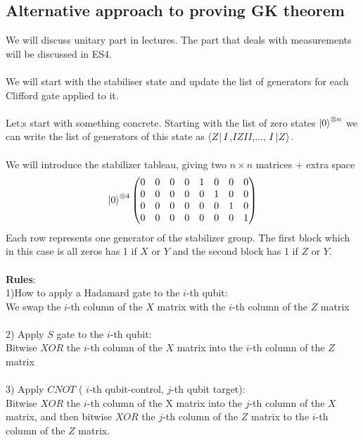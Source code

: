 \documentclass{article}
\begin{document}
\subsection{Alternative approach to proving GK theorem}
We will discuss unitary part in lectures. The part that deals with measurements will be discussed in ES4.\\\\
We will start with the stabiliser state and update the list of generators for each Clifford gate applied to it.\\\\
Let;s start with something concrete. Starting with the list of zero states $\ket{0}^{\otimes n}$ we can write the list of generators of this state as $\bra{Z} I$,$I Z I I$,..., $I \ket{Z}$.\\\\
We will introduce the stabilizer tableau, giving two $n\times n$ matrices + extra space
$$
\ket{0}^{\otimes 4} \begin{pmatrix} 0 & 0& 0 & 0 & 1 & 0  & 0 & 0\\
0 & 0& 0 & 0 & 0 & 1  & 0 & 0\\
0 & 0& 0 & 0 & 0 & 0  & 1 & 0\\
0 & 0& 0 & 0 & 0 & 0  & 0 & 1\\
\end{pmatrix}
$$
Each row represents one generator of the stabilizer group. The first block which in this case is all zeros has 1 if $X$ or $Y$ and the second block has 1 if $Z$ or $Y$.\\\\
\textbf{Rules}:\\
1)How to apply a Hadamard gate to the $i$-th qubit: \\
We swap the $i$-th column of the $X$ matrix with the $i$-th column of the $Z$ matrix\\\\
2) Apply $S$ gate to the $i$-th qubit:\\
Bitwise $XOR$ the $i$-th column of the $X$ matrix into the $i$-th column of the $Z$ matrix\\\\
3) Apply $CNOT$ ( $i$-th qubit-control, $j$-th qubit target):\\
Bitwise $XOR$ the $i$-th column of the X matrix into the $j$-th column of the $X$ matrix, and then bitwise $XOR$ the $j$-th column of the $Z$ matrix to the $i$-th column of the $Z$ matrix.
\end{document}
